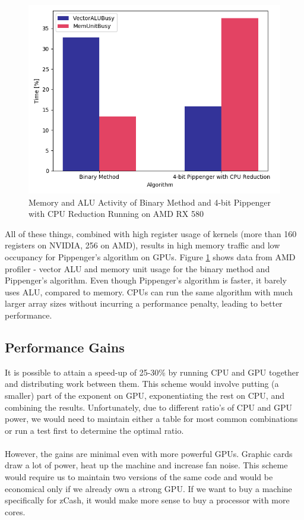 \begin{figure}[h]
    \includegraphics[width=\linewidth]{Figures/profiler.png}
    \caption{Memory and ALU Activity of Binary Method and 4-bit Pippenger with CPU Reduction Running on AMD RX 580}
    \label{fig:profiler}
\end{figure}

\noindent All of these things, combined with high register usage of kernels (more than 160 registers on NVIDIA, 256 on AMD), results in high memory traffic and low occupancy for Pippenger's algorithm on GPUs. Figure \ref{fig:profiler} shows data from AMD profiler - vector ALU and memory unit usage for the binary method and Pippenger's algorithm. Even though Pippenger's algorithm is faster, it barely uses ALU, compared to memory. CPUs can run the same algorithm with much larger array sizes without incurring a performance penalty, leading to better performance.

\subsection{Performance Gains}

It is possible to attain a speed-up of 25-30\% by running CPU and GPU together and distributing work between them. This scheme would involve putting (a smaller) part of the exponent on GPU, exponentiating the rest on CPU, and combining the results. Unfortunately, due to different ratio's of CPU and GPU power, we would need to maintain either a table for most common combinations or run a test first to determine the optimal ratio.\\
\\
However, the gains are minimal even with more powerful GPUs. Graphic cards draw a lot of power, heat up the machine and increase fan noise. This scheme would require us to maintain two versions of the same code and would be economical only if we already own a strong GPU. If we want to buy a machine specifically for zCash, it would make more sense to buy a processor with more cores.